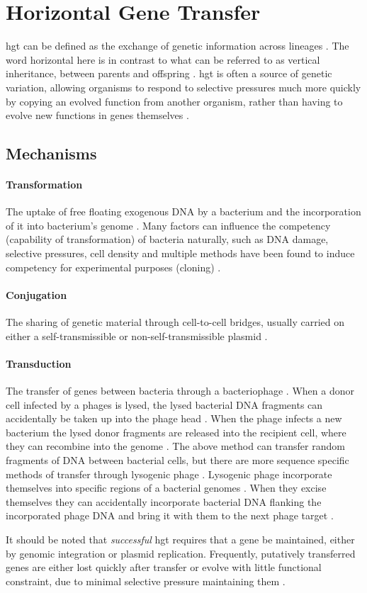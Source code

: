 \section{Horizontal Gene Transfer}
\ac{hgt} can be defined as the exchange of genetic information across lineages \citep{lgt}.
The word horizontal here is in contrast to what can be referred to as vertical inheritance, between parents and offspring \citep{ihgt}.
\ac{hgt} is often a source of genetic variation, allowing organisms to respond to selective pressures much more quickly by copying an evolved function from another organism, rather than having to evolve new functions in genes themselves \citep{ihgt,adaevo}.\par
\subsection{Mechanisms}
\paragraph{Transformation}
The uptake of free floating exogenous DNA by a bacterium and the incorporation of it into bacterium's genome \citep{lgt}.
Many factors can influence the competency (capability of transformation) of bacteria naturally, such as DNA damage, selective pressures, cell density and multiple methods have been found to induce competency for experimental purposes (cloning) \citep{natcomp}.
\paragraph{Conjugation}
The sharing of genetic material through cell-to-cell bridges, usually carried on either a self-transmissible or non-self-transmissible plasmid \citep{conjug}.
\paragraph{Transduction}
The transfer of genes between bacteria through a bacteriophage \citep{transd}.
When a donor cell infected by a phages is lysed, the lysed bacterial DNA fragments can accidentally be taken up into the phage head \citep{transd}.
When the phage infects a new bacterium the lysed donor fragments are released into the recipient cell, where they can recombine into the genome \citep{transd}.
The above method can transfer random fragments of DNA between bacterial cells, but there are more sequence specific methods of transfer through lysogenic phage \citep{transd}.
Lysogenic phage incorporate themselves into specific regions of a bacterial genomes \citep{transd}.
When they excise themselves they can accidentally incorporate bacterial DNA flanking the incorporated phage DNA and bring it with them to the next phage target \citep{transd}.\par
It should be noted that \textit{successful} \ac{hgt} requires that a gene be maintained, either by genomic integration or plasmid replication.
Frequently, putatively transferred genes are either lost quickly after transfer or evolve with little functional constraint, due to minimal selective pressure maintaining them \citep{fastlane}.

